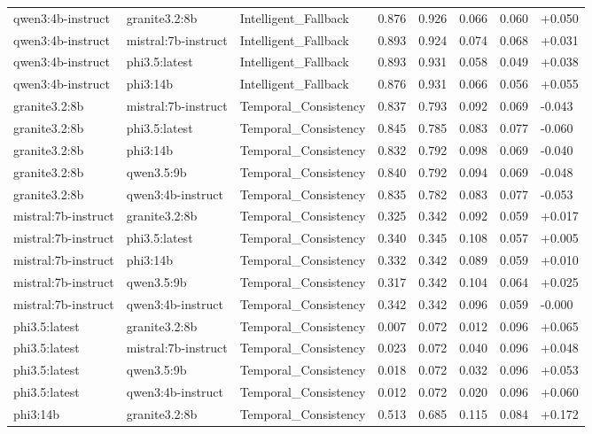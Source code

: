 \begin{table}
\begin{tabular}{llllllll}
qwen3:4b-instruct & granite3.2:8b & Intelligent_Fallback & 0.876 & 0.926 & 0.066 & 0.060 & +0.050 \\
qwen3:4b-instruct & mistral:7b-instruct & Intelligent_Fallback & 0.893 & 0.924 & 0.074 & 0.068 & +0.031 \\
qwen3:4b-instruct & phi3.5:latest & Intelligent_Fallback & 0.893 & 0.931 & 0.058 & 0.049 & +0.038 \\
qwen3:4b-instruct & phi3:14b & Intelligent_Fallback & 0.876 & 0.931 & 0.066 & 0.056 & +0.055 \\
granite3.2:8b & mistral:7b-instruct & Temporal_Consistency & 0.837 & 0.793 & 0.092 & 0.069 & -0.043 \\
granite3.2:8b & phi3.5:latest & Temporal_Consistency & 0.845 & 0.785 & 0.083 & 0.077 & -0.060 \\
granite3.2:8b & phi3:14b & Temporal_Consistency & 0.832 & 0.792 & 0.098 & 0.069 & -0.040 \\
granite3.2:8b & qwen3.5:9b & Temporal_Consistency & 0.840 & 0.792 & 0.094 & 0.069 & -0.048 \\
granite3.2:8b & qwen3:4b-instruct & Temporal_Consistency & 0.835 & 0.782 & 0.083 & 0.077 & -0.053 \\
mistral:7b-instruct & granite3.2:8b & Temporal_Consistency & 0.325 & 0.342 & 0.092 & 0.059 & +0.017 \\
mistral:7b-instruct & phi3.5:latest & Temporal_Consistency & 0.340 & 0.345 & 0.108 & 0.057 & +0.005 \\
mistral:7b-instruct & phi3:14b & Temporal_Consistency & 0.332 & 0.342 & 0.089 & 0.059 & +0.010 \\
mistral:7b-instruct & qwen3.5:9b & Temporal_Consistency & 0.317 & 0.342 & 0.104 & 0.064 & +0.025 \\
mistral:7b-instruct & qwen3:4b-instruct & Temporal_Consistency & 0.342 & 0.342 & 0.096 & 0.059 & -0.000 \\
phi3.5:latest & granite3.2:8b & Temporal_Consistency & 0.007 & 0.072 & 0.012 & 0.096 & +0.065 \\
phi3.5:latest & mistral:7b-instruct & Temporal_Consistency & 0.023 & 0.072 & 0.040 & 0.096 & +0.048 \\
phi3.5:latest & qwen3.5:9b & Temporal_Consistency & 0.018 & 0.072 & 0.032 & 0.096 & +0.053 \\
phi3.5:latest & qwen3:4b-instruct & Temporal_Consistency & 0.012 & 0.072 & 0.020 & 0.096 & +0.060 \\
phi3:14b & granite3.2:8b & Temporal_Consistency & 0.513 & 0.685 & 0.115 & 0.084 & +0.172 \\

\end{tabular}
\end{table}
